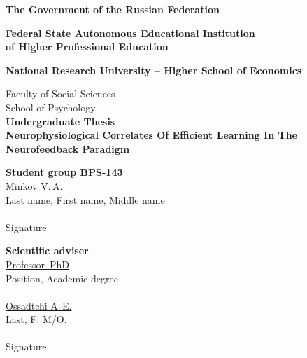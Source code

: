\documentclass[14pt,a4paper]{scrartcl}
\begin{document}
	\begin{titlepage}
		  \begin{center}
		    \large
		    \textbf{The Government of the Russian Federation}
		    
		    \textbf{Federal State Autonomous Educational Institution\\of Higher Professional Education}
		    \vspace{0.25cm}
		    
		   \textbf{National Research University – Higher School of Economics}
		   \vspace{0.25cm}

		   	Faculty of Social Sciences
		    \\School of Psychology\\[1cm]
		    
		    \textbf{Undergraduate Thesis}
		    \\[0.5cm]
		    \textbf{\guillemotleft Neurophysiological Correlates Of Efficient Learning In The Neurofeedback Paradigm \guillemotright}
		    \vfill
		     
			\end{center}

	\newlength{\ML}
	\hfill\begin{minipage}{0.4\textwidth}
	  \textbf{Student group BPS-143}\\[0.3cm]
	  \underline{Minkov V.\,A.} \\
	  \scriptsize{Last name, First name, Middle name}\\\\
	  \large
	  \underline{\hspace{7cm}}
	  \scriptsize{Signature}\\
			\end{minipage}%


	\hfill\begin{minipage}{0.4\textwidth}
	  \textbf{Scientific adviser}\\[0.3cm]
	  \underline{Professor\, PhD} \\
	  \scriptsize{Position, Academic degree}\\\\
	  \large
	  \underline{Ossadtchi A.\,E.} \\
	  \scriptsize{Last, F. M/O.}\\\\
	  \underline{\hspace{7cm}}
	  \scriptsize{Signature}\\
			\end{minipage}


\end{titlepage}
\end{document}
